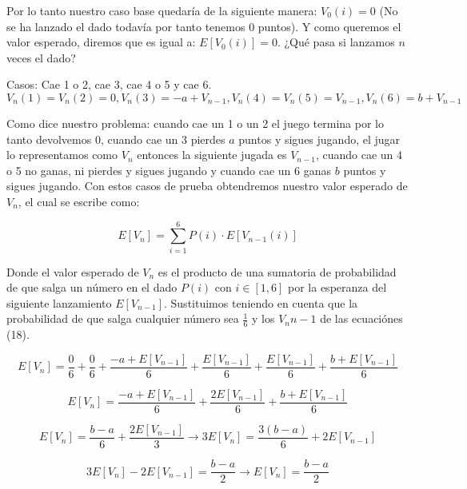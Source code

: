 \documentclass[12pt]{exam}
\begin{document}
\begin{enumerate}
\begin{enumerate}[label=d.]
\justify
Por lo tanto nuestro caso base quedar\'ia de la siguiente manera: $V_0(i) = 0$ (No se ha lanzado el dado todavía por tanto tenemos 0 puntos). Y como queremos el valor esperado, diremos que es igual a: $E[V_0(i)] = 0$. \mbox{¿}Qu\'e pasa si lanzamos $n$ veces el dado?

\justify
Casos: Cae 1 o 2, cae 3, cae 4 o 5 y cae 6.
\begin{equation}
    V_n(1) = V_n(2) = 0, V_n(3) = - a + V_{n-1}, V_n(4) = V_n(5) = V_{n-1}, V_n(6) = b + V_{n-1}
\end{equation}

\justify
Como dice nuestro problema: cuando cae un 1 o un 2 el juego termina por lo tanto devolvemos 0, cuando cae un 3 pierdes $a$ puntos y sigues jugando, el jugar lo representamos como $V_n$ entonces la siguiente jugada es $V_{n-1}$, cuando cae un 4 o 5 no ganas, ni pierdes y sigues jugando y cuando cae un 6 ganas $b$ puntos y sigues jugando. Con estos casos de prueba obtendremos nuestro valor esperado de $V_n$, el cual se escribe como:

\begin{equation}
    E[V_n] = \sum_{i=1}^6 P(i)\cdot E[V_{n-1}(i)]
\end{equation}

\justify
Donde el valor esperado de $V_n$ es el producto de una sumatoria de probabilidad de que salga un n\'umero en el dado $P(i)$ con $i\in[1,6]$ por la esperanza del siguiente lanzamiento $E[V_{n-1}]$. Sustituimos teniendo en cuenta que la probabilidad de que salga cualquier n\'umero sea $\frac{1}{6}$ y los $V_n{n-1}$ de las ecuaci\'ones (18).

\begin{equation}
    E[V_n] = \frac{0}{6} + \frac{0}{6} + \frac{- a + E[V_{n-1}]}{6} + \frac{E[V_{n-1}]}{6} + \frac{E[V_{n-1}]}{6} + \frac{b + E[V_{n-1}]}{6}
\end{equation}

\begin{equation}
     E[V_n] = \frac{- a + E[V_{n-1}]}{6} + \frac{2E[V_{n-1}]}{6} + \frac{b + E[V_{n-1}]}{6}
\end{equation}

\begin{equation}
     E[V_n] = \frac{b - a}{6} + \frac{2E[V_{n-1}]}{3} \rightarrow 3E[V_n] = \frac{3(b - a)}{6} + 2E[V_{n-1}]
\end{equation}

\begin{equation}
     3E[V_n] - 2E[V_{n-1}] = \frac{b - a}{2} \rightarrow E[V_n] = \frac{b-a}{2}
\end{equation}


\end{enumerate}
\end{enumerate}
\end{document}
